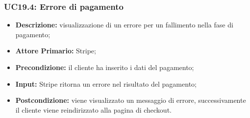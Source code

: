 \subsubsection{UC19.4: Errore di pagamento}
\label{sec:UC19.4}
\begin{itemize}
    \item \textbf{Descrizione:} visualizzazione di un errore per un fallimento nella fase di pagamento;
    \item \textbf{Attore Primario:} Stripe;
    \item \textbf{Precondizione:} il cliente ha inserito i dati del pagamento;
    \item \textbf{Input:} Stripe ritorna un errore nel risultato del pagamento;
    \item \textbf{Postcondizione:} viene visualizzato un messaggio di errore, successivamente il cliente viene reindirizzato alla pagina di checkout.
\end{itemize}